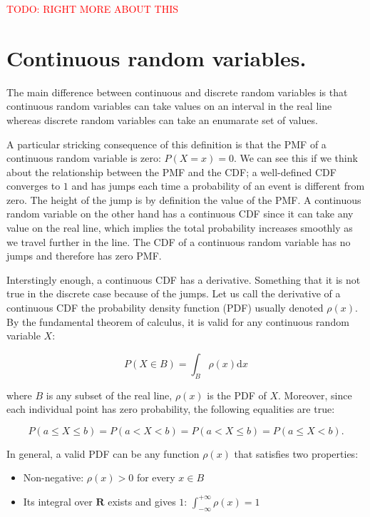 \documentclass[12pt]{article}
\begin{document}
\begin{center}
\textcolor{red}{TODO: RIGHT MORE ABOUT THIS}
\end{center}


\section{Continuous random variables.}

The main difference between continuous and discrete random variables is that 
continuous random variables can take values on an interval in the real line whereas 
discrete random variables can take an enumarate set of values.

A particular stricking consequence of this definition is that the PMF of 
a continuous random variable is zero: $P(X  = x) = 0$.
We can see this if we think about the relationship between the PMF and the CDF;
a well-defined CDF converges to $1$ and has jumps each time a probability of an 
event is different from zero. The height of the jump is by definition the value of 
the PMF. A continuous random variable on the other hand has a continuous CDF since it 
can take any value on the real line, which implies the total probability increases
smoothly as we travel further in the line. 
The CDF of a continuous random variable has no jumps and therefore has
zero PMF.

Interstingly enough, a continuous CDF has a derivative.
Something that it is not true in the discrete case because of the jumps.
Let us call the derivative of a continuous CDF the probability density function (PDF)
usually denoted $\rho(x)$.
By the fundamental theorem of calculus, it is valid for any continuous random variable
$X$:

\begin{equation}
P( X \in B) = \int_{B} \rho(x) \mathrm{d}x
\end{equation}

\noindent
where $B$ is any subset of the real line, $\rho(x)$ is the PDF of $X$.
Moreover, since each individual point has zero probability, the
following equalities are true:

\begin{equation}
P( a \leq X \leq b ) = P( a < X < b ) = P( a < X \leq b ) = P ( a \leq X < b).
\end{equation}

In general, a valid PDF can be any function $\rho(x)$ that satisfies two properties:

\begin{itemize}
\item Non-negative: $\rho (x) > 0$ for every $x \in B$
\item Its integral over $\mathbf{R}$ exists and gives $1$: $\int_{-\infty}^{+\infty} \rho(x) = 1$
\end{itemize}
\end{document}
